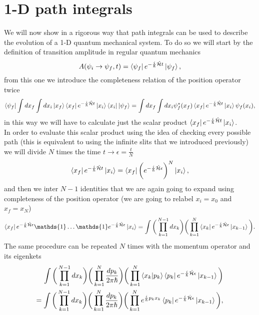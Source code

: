 \section{1-D path integrals}
We will now show in a rigorous way that path integrals can be used to describe the evolution of a 1-D quantum mechanical system. To do so we will start by the definition of transition amplitude in regular quantum mechanics
\begin{equation*}
    A(\psi_i\rightarrow\psi_f,t)=\bra{\psi_f}e^{-\frac{i}{\hslash}\hat{\mathcal{H} }t}\ket{\psi_f},
\end{equation*}
from this one we introduce the completeness relation of the position operator twice
\begin{equation*}
    \bra{\psi_f}\int dx_f\int dx_i\ket{x_f}\bra{x_f}e^{-\frac{i}{\hslash}\hat{\mathcal{H} }t}\ket{x_i}\bra{x_i}\ket{\psi_f}=
        \int dx_f\int dx_i \psi_f^*(x_f)\bra{x_f}e^{-\frac{i}{\hslash}\hat{\mathcal{H} }t}\ket{x_i}\psi_f(x_i),
\end{equation*}
in this way we will have to calculate just the scalar product $\bra{x_f}e^{-\frac{i}{\hslash}\hat{\mathcal{H} }t}\ket{x_i}$.\\
In order to evaluate this scalar product using the idea of checking every possible path (this is equivalent to using the infinite slits that we introduced previously) we will divide $N$ times the time $t\rightarrow\epsilon=\frac{t}{N}$
\begin{equation*}
    \bra{x_f}e^{-\frac{i}{\hslash}\hat{\mathcal{H} }t}\ket{x_i}=\bra{x_f}\bigg(e^{-\frac{i}{\hslash}\hat{\mathcal{H} }\epsilon}\bigg)^N\ket{x_i},
\end{equation*}
and then we inter $N-1$ identities that we are again going to expand using completeness of the position operator (we are going to relabel $x_i=x_0$ and $x_f=x_N$)
\begin{equation*}
    \bra{x_f}e^{-\frac{i}{\hslash}\hat{\mathcal{H} }\epsilon}\mathds{1}\dots\mathds{1}e^{-\frac{i}{\hslash}\hat{\mathcal{H} }\epsilon}\ket{x_i}=\int\bigg(\prod_{k=1}^{N-1}dx_k\bigg)\bigg(\prod_{k=1}^{N}\bra{x_k}e^{-\frac{i}{\hslash}\hat{\mathcal{H} }\epsilon}\ket{x_{k-1}}\bigg).
\end{equation*} 
The same procedure can be repeated $N$ times with the momentum operator and its eigenkets
\begin{align*}
    \int\bigg(\prod_{k=1}^{N-1}dx_k\bigg)\bigg(\prod_{k=1}^{N}\frac{dp_k}{2\pi\hslash}\bigg)\bigg(\prod_{k=1}^{N}\braket{x_k|p_k}\bra{p_k}e^{-\frac{i}{\hslash}\hat{\mathcal{H} }\epsilon}\ket{x_{k-1}}\bigg)\\=\int\bigg(\prod_{k=1}^{N-1}dx_k\bigg)\bigg(\prod_{k=1}^{N}\frac{dp_k}{2\pi\hslash}\bigg)\bigg(\prod_{k=1}^{N}e^{\frac{i}{\hslash}p_kx_k}\bra{p_k}e^{-\frac{i}{\hslash}\hat{\mathcal{H} }\epsilon}\ket{x_{k-1}}\bigg),
\end{align*}
